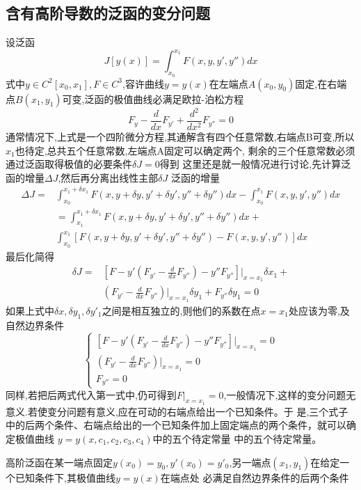 \documentclass{article}
\begin{document}
\subsection{含有高阶导数的泛函的变分问题}
设泛函
\begin{equation}
 J[y(x)]=\int_{x_0}^{x_1}F(x,y,y',y'')dx
\end{equation}
式中$y \in C^2[x_0,x_1],F \in C^3$,容许曲线$y=y(x)$在左端点$A(x_0,y_0)$固定,在右端点$B(x_1,y_1)$可变,泛函的极值曲线必满足欧拉-泊松方程
$$F_y - \frac{d}{dx}F_{y'} + \frac{d^2}{dx^2}F_{y''}=0  $$
通常情况下,上式是一个四阶微分方程,其通解含有四个任意常数,右端点B可变,所以$x_1$也待定,总共五个任意常数,左端点A固定可以确定两个,
剩余的三个任意常数必须通过泛函取得极值的必要条件$\delta J=0$得到
这里还是就一般情况进行讨论,先计算泛函的增量$\Delta J$,然后再分离出线性主部$\delta J$
泛函的增量
\begin{equation}
 \begin{split}
 \Delta J = & \int_{x_0}^{x_1+\delta x_1}F(x,y+\delta y,y'+\delta y',y''+\delta y'')dx- \int_{x_0}^{x_1}F(x,y,y',y'')dx \\
              &  =\int_{x_1}^{x_1+\delta x_1}F(x,y+\delta y,y'+\delta y',y''+\delta y'')dx + \\
               & \int_{x_0}^{x_1}[F(x,y+\delta y,y'+\delta y',y''+\delta y'') -F(x,y,y',y'') ]dx
 \end{split}
\end{equation}
最后化简得
\begin{equation}
\begin{split}
 \delta J = & [F - y'(F_{y'}-\frac{d}{dx}F_{y''}) - y''F_{y''}]|_{x=x_1} \delta x_1 + \\
 & (F_{y'}-\frac{d}{dx}F_{y''})|_{x=x_1}\delta y_1 + F_{y''}\delta y_1 =0
\end{split}
\end{equation}
如果上式中$\delta x , \delta y_1, \delta y'_1$之间是相互独立的,则他们的系数在点$x=x_1$处应该为零,及自然边界条件
\begin{equation}
\left\{
  \begin{array}{ll}
[F - y'(F_{y'}-\frac{d}{dx}F_{y''}) - y''F_{y''}]|_{x=x_1}=0 \\
(F_{y'}-\frac{d}{dx}F_{y''})|_{x=x_1}=0\\
F_{y''}=0
  \end{array}
\right.
\end{equation}
同样,若把后两式代入第一式中,仍可得到$F|_{x=x_1}=0$,一般情况下,这样的变分问题无意义.若使变分问题有意义,应在可动的右端点给出一个已知条件。于
是,三个式子中的后两个条件、右端点给出的一个已知条件加上固定端点的两个条件，就可以确 定极值曲线
$y=y(x,c_1,c_2,c_3,c_4)$中的五个待定常量
中的五个待定常量。
\begin{theorem}
 高阶泛函在某一端点固定$y(x_0)=y_0,y'(x_0)=y'_0$,另一端点$(x_1,y_1)$在给定一个已知条件下,其极值曲线$y=y(x)$在端点处
必满足自然边界条件的后两个条件
\end{theorem}
\end{document}
